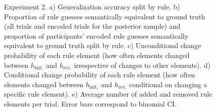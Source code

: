 \documentclass[doc,natbib,floatsintext]{apa7}
\newcommand{\hr}{h_{\mathrm{rev.}}}
\newcommand{\hi}{h_{\mathrm{init.}}}
\begin{document}
\begin{figure}[!t]
    \begin{center}
    \end{center}
   \caption{Experiment 2. a) Generalization accuracy split by rule. b) Proportion of rule guesses semantically equivalent to ground truth (all trials and encoded trials for the posterior sample) and proportion of participants' encoded rule guesses semantically equivalent to ground truth split by rule. c) Unconditional change probability of each rule element (how often elements changed between $\hi$ and $\hr$ irrespective of changes to other elements). d) Conditional change probability of each rule element (how often elements changed between $\hi$ and $\hr$ conditional on changing a specific rule element). e) Average number of added and removed rule elements per trial. Error bars correspond to binomial CI.}
    \label{fig:fig_6_exp_2_behavioural_res}
\end{figure}
\end{document}
